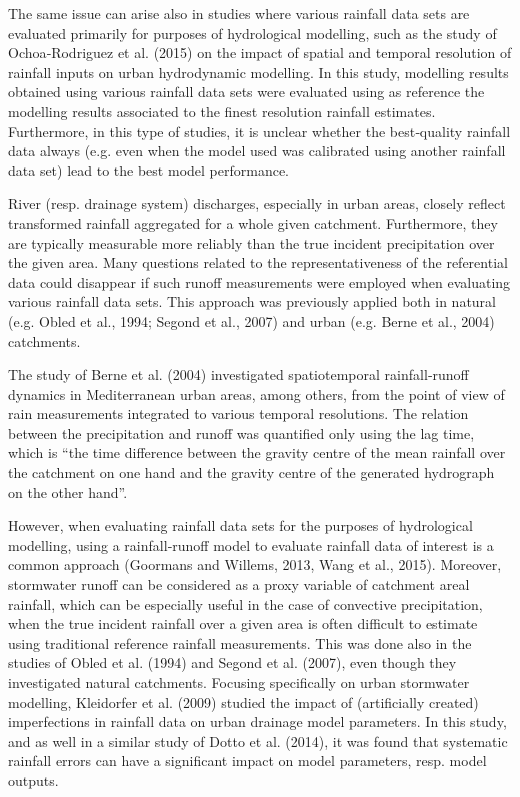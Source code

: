 \documentclass{ctuthesis}\usepackage[]{graphicx}\usepackage[]{color}
\begin{document}
The same issue can arise also in studies where various rainfall data sets are evaluated primarily for
purposes of hydrological modelling, such as the study of Ochoa‐Rodriguez et al. (2015) on the impact
of spatial and temporal resolution of rainfall inputs on urban hydrodynamic modelling. In this study,
modelling results obtained using various rainfall data sets were evaluated using as reference the
modelling results associated to the finest resolution rainfall estimates. Furthermore, in this type of
studies, it is unclear whether the best‐quality rainfall data always (e.g. even when the model used
was calibrated using another rainfall data set) lead to the best model performance.

River (resp. drainage system) discharges, especially in urban areas, closely reflect transformed rainfall
aggregated for a whole given catchment. Furthermore, they are typically measurable more reliably
than the true incident precipitation over the given area. Many questions related to the
representativeness of the referential data could disappear if such runoff measurements were
employed when evaluating various rainfall data sets. This approach was previously applied both in
natural (e.g. Obled et al., 1994; Segond et al., 2007) and urban (e.g. Berne et al., 2004) catchments.

The study of Berne et al. (2004) investigated spatiotemporal rainfall‐runoff dynamics in
Mediterranean urban areas, among others, from the point of view of rain measurements integrated
to various temporal resolutions. The relation between the precipitation and runoff was quantified
only using the lag time, which is “the time difference between the gravity centre of the mean rainfall
over the catchment on one hand and the gravity centre of the generated hydrograph on the other
hand”.

However, when evaluating rainfall data sets for the purposes of hydrological modelling, using a rainfall‐runoff model to evaluate rainfall data of interest is a common approach (Goormans and Willems, 2013, Wang et al., 2015). Moreover, stormwater runoff can be considered as a proxy variable of catchment areal rainfall, which can be especially useful in the case of convective precipitation, when the true incident rainfall over a given area is often difficult to estimate using traditional reference rainfall measurements. This was done also in the studies of Obled et al. (1994) and Segond et al. (2007), even though
they investigated natural catchments. Focusing specifically on urban stormwater modelling,
Kleidorfer et al. (2009) studied the impact of (artificially created) imperfections in rainfall data on urban drainage model parameters. In this study, and as well in a similar study of Dotto et al. (2014), it was found that systematic rainfall errors can have a significant impact on model parameters, resp. model outputs.
\end{document}
